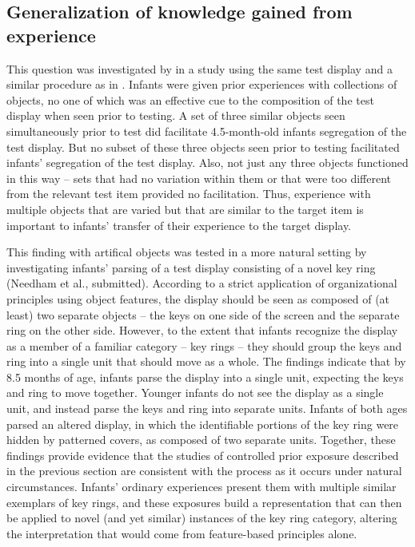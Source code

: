 %


\subsection{Generalization of knowledge gained from experience}

This question was investigated by 
in a study using the same test display and a similar procedure as in
.  Infants were given prior experiences with collections
of objects, no one of which was an effective cue to the composition of
the test display when seen prior to testing.  A set of three similar
objects seen simultaneously prior to test did facilitate 4.5-month-old
infants segregation of the test display.  But no subset of these three
objects seen prior to testing facilitated infants' segregation of the
test display.  Also, not just any three objects functioned in this way
-- sets that had no variation within them or that were too different
from the relevant test item provided no facilitation.  Thus,
experience with multiple objects that are varied but that are similar
to the target item is important to infants' transfer of their
experience to the target display.


This finding 
with artifical objects was tested in a more natural setting
%
%
by investigating
infants' parsing of a test display consisting of a novel key
ring (Needham et al., submitted).  
%
According to a strict
application of organizational principles using object features, the
display should be seen as composed of (at least) two separate
objects -- the keys on one side of the screen and the separate
ring on the other side.  However, to the extent that infants recognize
the display as a member of a familiar category -- key
rings -- they should group the keys and ring into a single unit
that should move as a whole.  The findings indicate that by 8.5 months
of age, infants parse the display into a single unit, expecting the
keys and ring to move together.  Younger infants do not see the
display as a single unit, and instead parse the keys and ring into
separate units.  Infants of both ages parsed an altered display, in
which the identifiable portions of the key ring were hidden by
patterned covers, as composed of two separate units.  Together, these
findings provide evidence that the studies of controlled prior
exposure described in the previous section are consistent with the
process as it occurs under natural circumstances.  Infants'
ordinary experiences present them with multiple similar exemplars of
key rings, and these exposures build a representation that can then be
applied to novel (and yet similar) instances of the key ring category,
altering the interpretation that would come from feature-based
principles alone.


